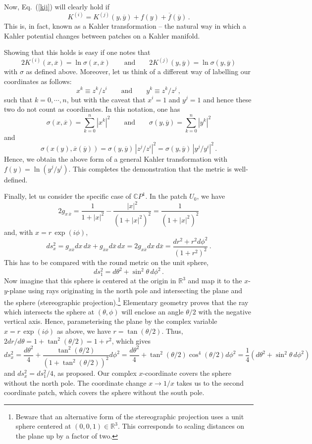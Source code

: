 \documentclass[12pt]{article}
\newcommand{\be}{\begin{equation}}
\newcommand{\ee}{\end{equation}}
\newcommand{\ol}{\overline}
\numberwithin{equation}{section}
\begin{document}
Now, Eq.~(\ref{kij}) will clearly hold if
\be
K^{(i)}=K^{(j)}(y,\ol{y})+f(y)+\ol{f}(\ol{y})\,.
\ee
This is, in fact, known as a Kahler transformation -- the natural way in which a Kahler potential changes between patches on a Kahler manifold.

Showing that this holds is easy if one notes that
\be
2K^{(i)}(x,\ol{x})=\ln\sigma(x,\ol{x})\qquad \mbox{and}\qquad 
2K^{(j)}(y,\ol{y})=\ln\sigma(y,\ol{y})
\ee
with $\sigma$ as defined above. Moreover, let us think of a different way of labelling our coordinates as follows:
\be
x^k\equiv z^k/z^i\qquad \mbox{and}\qquad y^k\equiv z^k/z^j\,,
\ee
such that $k=0,\cdots,n$, but with the caveat that $x^i=1$ and $y^j=1$ and hence these two do not count as coordinates. In this notation, one has
\be
\sigma(x,\ol{x})=\sum_{k=0}^n|x^k|^2\qquad \mbox{and}\qquad \sigma(y,\ol{y})=\sum_{k=0}^n|y^k|^2
\ee
and 
\be
\sigma(x(y),\ol{x}(\ol{y}))=\sigma(y,\ol{y})\,|z^j/z^i|^2
=\sigma(y,\ol{y})\,|y^j/y^i|^2\,.
\ee
Hence, we obtain the above form of a general Kahler transformation with 
$f(y)=\ln(y^j/y^i)$. This completes the demonstration that the metric is well-defined.

Finally, let us consider the specific case of $\mathbb{C}\!P^1$. In the patch $U_0$, we have
\be
2g_{x\,\ol{x}}=\frac{1}{1+|x|^2}-\frac{|x|^2}{(1+|x|^2)^2}=\frac{1}{(1+|x|^2)^2}
\ee
and, with $x=r\,\exp(i\phi)$,
\be
ds_x^2=g_{x\ol{x}}dx\,d\ol{x}+g_{\ol{x}x}d\ol{x}\,dx=2g_{x\ol{x}}dx\,d\ol{x}=
\frac{dr^2+r^2d\phi^2}{(1+r^2)^2}\,.
\ee
This has to be compared with the round metric on the unit sphere,
\be
ds_1^2=d\theta^2+\sin^2\theta\,d\phi^2\,.
\ee
Now imagine that this sphere is centered at the origin in $\mathbb{R}^3$ and map it to the $x$-$y$-plane using rays originating in the north pole and intersecting the plane and the sphere (stereographic projection).\footnote{
Beware 
that an alternative form of the stereographic projection uses a unit sphere centered at $(0,0,1)\in \mathbb{R}^3$. This corresponds to scaling distances on the plane up by a factor of two.
} 
Elementary geometry proves that the ray which intersects the sphere at $(\theta,\phi)$  will enclose an angle $\theta/2$ with the negative vertical axis. Hence, parameterising the plane by the complex variable $x=r\,\exp(i\phi)$ as above, we have $r=\tan(\theta/2)$. Thus, $2dr/d\theta =1+\tan^2(\theta/2)=1+r^2$, which gives
\be
ds_x^2=\frac{d\theta^2}{4}+\frac{\tan^2(\theta/2)}{(1+\tan^2(\theta/2))^2} d\phi^2 = \frac{d\theta^2}{4}+\tan^2(\theta/2)\cos^4(\theta/2) d\phi^2=\frac{1}{4}(d\theta^2+\sin^2\theta\,d\phi^2)
\ee
and $ds_x^2=ds_1^2/4$, as proposed. Our complex $x$-coordinate covers the sphere without the north pole. The coordinate change $x\to 1/x$ takes us to the second coordinate patch, which covers the sphere without the south pole.
\end{document}
